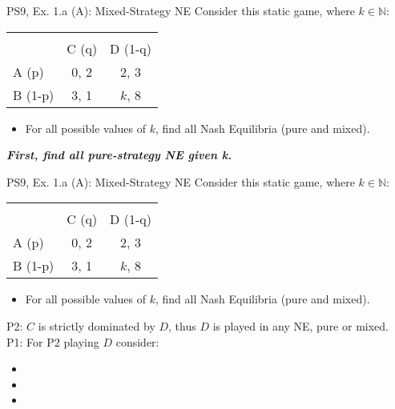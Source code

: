 \begin{frame}{PS9, Ex. 1.a (A): Mixed-Strategy NE}
    Consider this static game, where $k\in\mathbb{N}:$
    \vspace{-16pt}
    \begin{table}
      \begin{tabular}{l|c|c|}
        \multicolumn{1}{c}{} & \multicolumn{2}{c}{} \\
        \multicolumn{1}{c}{} & \multicolumn{1}{c}{C (q)} & \multicolumn{1}{c}{D (1-q)} \\\cline{2-3}
        A (p)   & 0, 2 & 2, 3 \\\cline{2-3}
        B (1-p) & 3, 1 & $k$, 8 \\\cline{2-3}
      \end{tabular}
    \end{table}
    \begin{itemize}
      \item[(a)] For all possible values of $k$, find all Nash Equilibria (pure and mixed).
    \end{itemize}
    \textbf{\textit{First, find all pure-strategy NE given k.}}
    \vfill\null
\end{frame}
\begin{frame}{PS9, Ex. 1.a (A): Mixed-Strategy NE}
      Consider this static game, where $k\in\mathbb{N}:$
      \vspace{-16pt}
      \begin{table}
        \begin{tabular}{l|c|c|}
          \multicolumn{1}{c}{} & \multicolumn{2}{c}{} \\
          \multicolumn{1}{c}{} & \multicolumn{1}{c}{C (q)} & \multicolumn{1}{c}{\color{blue}D (1-q)} \\\cline{2-3}
          A (p)   & 0, 2 & 2, \color{blue}3 \\\cline{2-3}
          B (1-p) & 3, 1 & $k$, \color{blue}8 \\\cline{2-3}
        \end{tabular}
      \end{table}
      \begin{itemize}
        \item[(a)] For all possible values of $k$, find all Nash Equilibria (pure and mixed).
      \end{itemize}
      P2: $C$ is strictly dominated by $D$, thus $D$ is played in any NE, pure or mixed.\\\medskip
      P1: For P2 playing $D$ consider:
      \begin{itemize}
        \item[$k=$1:]
        \item[$k=$2:]
        \item[$k\geq$3:]
      \end{itemize}
      \vfill\null
\end{frame}
